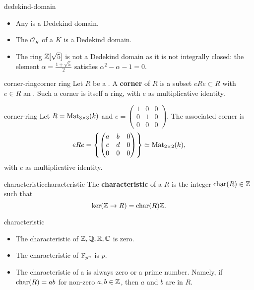 \begin{example}{dedekind-domain}
    \begin{itemize}
        \item Any  is a Dedekind domain.
        \item The  $\mathcal{O}_K$ of a  $K$ is a Dedekind domain.
        \item The ring $\mathbb{Z}[\sqrt{5}]$ is not a Dedekind domain as it is not integrally closed: the element $\alpha = \frac{1 + \sqrt{5}}{2}$ satisfies $\alpha^2 - \alpha - 1 = 0$.
    \end{itemize}
\end{example}

\begin{topic}{corner-ring}{corner ring}
    Let $R$ be a . A \textbf{corner} of $R$ is a subset $eRe \subset R$ with $e \in R$ an . Such a corner is itself a ring, with $e$ as multiplicative identity.
\end{topic}

\begin{example}{corner-ring}
    Let $R = \textup{Mat}_{3 \times 3}(k)$ and $e = \begin{pmatrix} 1 & 0 & 0 \\ 0 & 1 & 0 \\ 0 & 0 & 0 \end{pmatrix}$. The associated corner is
    \[ eRe = \left\{ \begin{pmatrix} a & b & 0 \\ c & d & 0 \\ 0 & 0 & 0 \end{pmatrix} \right\} \simeq \textup{Mat}_{2 \times 2}(k) , \]
    with $e$ as multiplicative identity.
\end{example}

\begin{topic}{characteristic}{characteristic}
    The \textbf{characteristic} of a  $R$ is the integer $\textup{char}(R) \in \mathbb{Z}$ such that
    \[ \ker(\mathbb{Z} \to R) = \textup{char}(R) \mathbb{Z} . \]
\end{topic}

\begin{example}{characteristic}
    \begin{itemize}
        \item The characteristic of $\mathbb{Z}, \mathbb{Q}, \mathbb{R}, \mathbb{C}$ is zero.
        \item The characteristic of $\mathbb{F}_{p^n}$ is $p$.
        \item The characteristic of a  is always zero or a prime number. Namely, if $\textup{char}(R) = ab$ for non-zero $a, b \in \mathbb{Z}$, then $a$ and $b$ are  in $R$.
    \end{itemize}
\end{example}

